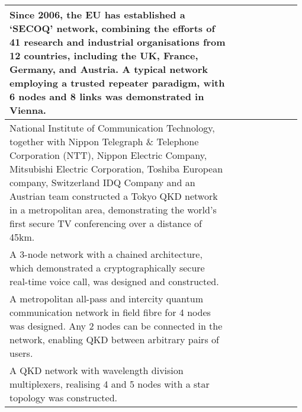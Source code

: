 \begin{table*}[!htbp]
\begin{tabular}{|p{0.755\linewidth}|p{0.22\linewidth}|}
\hline
Since 2006, the EU has established a `SECOQ' network, combining the efforts of 41 research and industrial organisations from 12 countries, including the UK, France, Germany, and Austria. A typical network employing a trusted repeater paradigm, with 6 nodes and 8 links was demonstrated in Vienna. & \cite{bib:NJP_11_075001}\\
\hline
National Institute of Communication Technology, together with Nippon Telegraph \& Telephone Corporation (NTT), Nippon Electric Company, Mitsubishi Electric Corporation, Toshiba European company, Switzerland IDQ Company and an Austrian team constructed a Tokyo QKD network in a metropolitan area, demonstrating the world's first secure TV conferencing over a distance of 45km. & \cite{bib:OExp_19_10387}\\
\hline
 A 3-node network with a chained architecture, which demonstrated a cryptographically secure real-time voice call, was designed and constructed. & \cite{bib:OpEx17_6540}\\
 \hline
 A metropolitan all-pass and intercity quantum communication network in field fibre for 4 nodes was designed. Any 2 nodes can be connected in the network, enabling QKD between arbitrary pairs of users. &\cite{bib:OpEx_18_27217}\\
 \hline
 A QKD network with wavelength division multiplexers, realising 4 and 5 nodes with a star topology was constructed. &\cite{bib:PLA_372_3957,bib:OL_35_2454}\\
 \hline

\end{tabular}
\end{table*}
